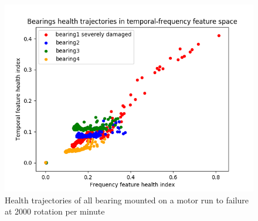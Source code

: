 \documentclass[../Main/thesis.tex]{subfiles}
\begin{document}
\begin{figure}[H] %
   \centering
   \includegraphics[width=5in]{../fig/health_plot.png} 
   \caption{Health trajectories of all bearing mounted on a motor run to failure at 2000 rotation per minute}
   \label{fig:health_plot}
\end{figure}
\end{document}
